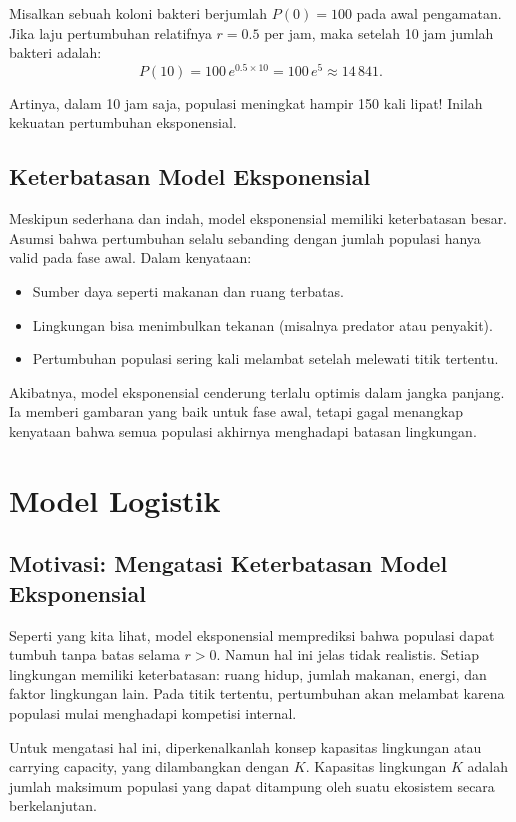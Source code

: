 \documentclass{bukumjh}
\begin{document}
Misalkan sebuah koloni bakteri berjumlah $P(0) = 100$ pada awal pengamatan. Jika laju pertumbuhan relatifnya $r = 0.5$ per jam, maka setelah 10 jam jumlah bakteri adalah:
\[
P(10) = 100 \, e^{0.5 \times 10} = 100 \, e^{5} \approx 14\,841.
\]

Artinya, dalam 10 jam saja, populasi meningkat hampir 150 kali lipat! Inilah kekuatan pertumbuhan eksponensial.

\subsection*{Keterbatasan Model Eksponensial}

Meskipun sederhana dan indah, model eksponensial memiliki keterbatasan besar. Asumsi bahwa pertumbuhan selalu sebanding dengan jumlah populasi hanya valid pada fase awal. Dalam kenyataan:
\begin{itemize}
    \item Sumber daya seperti makanan dan ruang terbatas.
    \item Lingkungan bisa menimbulkan tekanan (misalnya predator atau penyakit).
    \item Pertumbuhan populasi sering kali melambat setelah melewati titik tertentu.
\end{itemize}

Akibatnya, model eksponensial cenderung terlalu optimis dalam jangka panjang. Ia memberi gambaran yang baik untuk fase awal, tetapi gagal menangkap kenyataan bahwa semua populasi akhirnya menghadapi batasan lingkungan.

\section{Model Logistik}

\subsection*{Motivasi: Mengatasi Keterbatasan Model Eksponensial}

Seperti yang kita lihat, model eksponensial memprediksi bahwa populasi dapat tumbuh tanpa batas selama $r > 0$. Namun hal ini jelas tidak realistis. Setiap lingkungan memiliki keterbatasan: ruang hidup, jumlah makanan, energi, dan faktor lingkungan lain. Pada titik tertentu, pertumbuhan akan melambat karena populasi mulai menghadapi kompetisi internal.  

Untuk mengatasi hal ini, diperkenalkanlah konsep {\jsg kapasitas lingkungan} atau {\jsg carrying capacity}, yang dilambangkan dengan $K$. Kapasitas lingkungan $K$ adalah jumlah maksimum populasi yang dapat ditampung oleh suatu ekosistem secara berkelanjutan.
\end{document}
